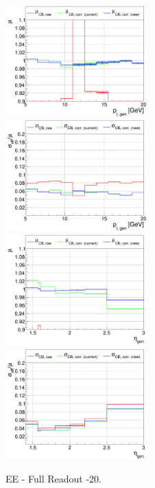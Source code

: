 \begin{figure}
\includegraphics[width=0.495\textwidth]{./plots_pdf/ECAL_plots/plotsNoPU/EE/pdf/FULL/GENPT/EEFULL_GENPT_0005_0020_MuOverBins.pdf}
\includegraphics[width=0.495\textwidth]{./plots_pdf/ECAL_plots/plotsNoPU/EE/pdf/FULL/GENPT/EEFULL_GENPT_0005_0020_EffSigmaOverBins.pdf}
\includegraphics[width=0.495\textwidth]{./plots_pdf/ECAL_plots/plotsNoPU/EE/pdf/FULL/GENETA/EEFULL_GENETA_0005_0020_MuOverBins.pdf}
\includegraphics[width=0.495\textwidth]{./plots_pdf/ECAL_plots/plotsNoPU/EE/pdf/FULL/GENETA/EEFULL_GENETA_0005_0020_EffSigmaOverBins.pdf}
\caption{EE - Full Readout -20\GeV.}
\end{figure}


